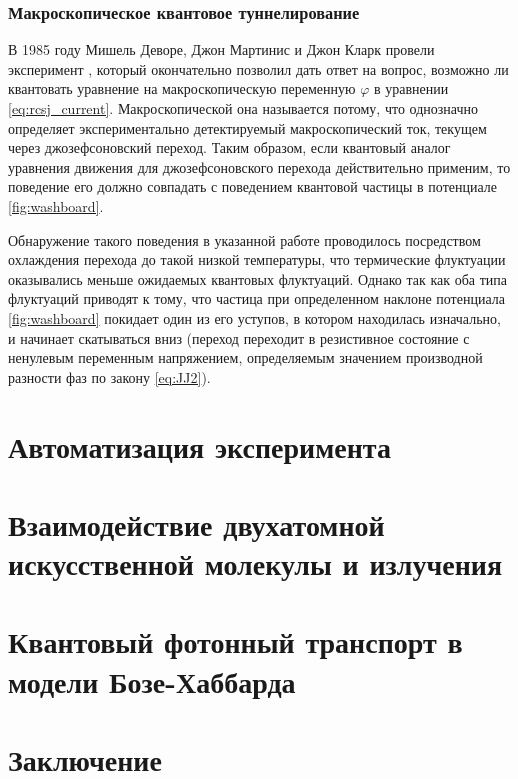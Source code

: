 \documentclass[14pt, a4paper]{extreport}
\renewcommand*\thesection{\arabic{section}}
\numberwithin{equation}{section}
\renewcommand*\thesection{\arabic{chapter}.\arabic{section}}
\begin{document}
\subsection{Макроскопическое квантовое туннелирование}

В 1985 году Мишель Деворе, Джон Мартинис и Джон Кларк провели эксперимент \cite{devoret1985measurements}, который окончательно позволил дать ответ на вопрос, возможно ли квантовать уравнение на макроскопическую переменную $\varphi$ в уравнении \eqref{eq:rcsj_current}. Макроскопической она называется потому, что однозначно определяет экспериментально детектируемый макроскопический ток, текущем через джозефсоновский переход. Таким образом, если квантовый аналог уравнения движения для джозефсоновского перехода действительно применим, то поведение его должно совпадать с поведением квантовой частицы в потенциале \autoref{fig:washboard}. 

Обнаружение такого поведения в указанной работе проводилось посредством охлаждения перехода до такой низкой температуры, что термические флуктуации оказывались меньше ожидаемых квантовых флуктуаций. Однако так как оба типа флуктуаций приводят к тому, что частица при определенном наклоне потенциала \autoref{fig:washboard} покидает один из его уступов, в котором находилась изначально, и начинает скатываться вниз (переход переходит в резистивное состояние с ненулевым переменным напряжением, определяемым значением производной разности фаз по закону \eqref{eq:JJ2}). 




\chapter{Автоматизация эксперимента}

\chapter{Взаимодействие двухатомной искусственной молекулы и излучения}

\chapter{Квантовый фотонный транспорт в модели Бозе-Хаббарда}

\chapter{Заключение}


\appendix
\renewcommand*\thesection{\Alph{chapter}.\arabic{section}}


\renewcommand\bibname{Список литературы}


\end{document}
